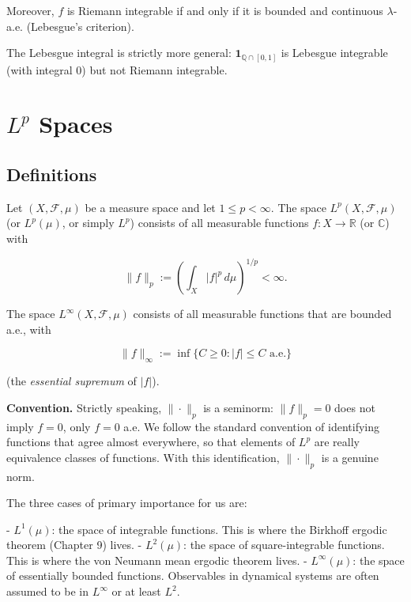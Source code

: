 Moreover, $f$ is Riemann integrable if and only if it is bounded and continuous $\lambda$-a.e. (Lebesgue's criterion).

The Lebesgue integral is strictly more general: $\mathbf{1}_{\mathbb{Q} \cap [0,1]}$ is Lebesgue integrable (with integral $0$) but not Riemann integrable.


\bigskip


\section{$L^p$ Spaces}\label{sec:7.5}

\subsection{Definitions}\label{sec:7.5.1}

\begin{definition}\label{def:7.27.}
Let $(X, \mathcal{F}, \mu)$ be a measure space and let $1 \leq p < \infty$. The space $L^p(X, \mathcal{F}, \mu)$ (or $L^p(\mu)$, or simply $L^p$) consists of all measurable functions $f: X \to \mathbb{R}$ (or $\mathbb{C}$) with

\[
\|f\|_p := \left( \int_X |f|^p \, d\mu \right)^{1/p} < \infty.
\]

The space $L^\infty(X, \mathcal{F}, \mu)$ consists of all measurable functions that are bounded a.e., with

\[
\|f\|_\infty := \inf\{C \geq 0 : |f| \leq C \text{ a.e.}\}
\]

(the \textit{essential supremum} of $|f|$).

\textbf{Convention.} Strictly speaking, $\|\cdot\|_p$ is a seminorm: $\|f\|_p = 0$ does not imply $f = 0$, only $f = 0$ a.e. We follow the standard convention of identifying functions that agree almost everywhere, so that elements of $L^p$ are really equivalence classes of functions. With this identification, $\|\cdot\|_p$ is a genuine norm.

The three cases of primary importance for us are:

- \textbf{$L^1(\mu)$}: the space of integrable functions. This is where the Birkhoff ergodic theorem (Chapter 9) lives.
- \textbf{$L^2(\mu)$}: the space of square-integrable functions. This is where the von Neumann mean ergodic theorem lives.
- \textbf{$L^\infty(\mu)$}: the space of essentially bounded functions. Observables in dynamical systems are often assumed to be in $L^\infty$ or at least $L^2$.
\end{definition}


